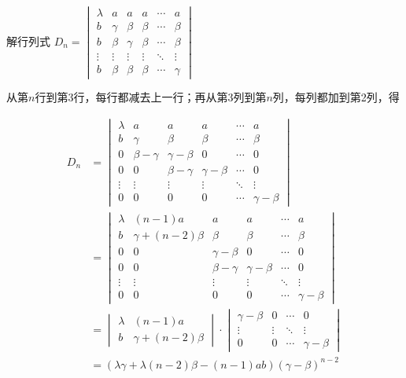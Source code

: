 \begin{example}
    解行列式
    $D_n=\begin{vmatrix}
        \lambda & a & a & a & \cdots & a \\
        b & \gamma & \beta & \beta & \cdots & \beta \\
        b & \beta & \gamma & \beta & \cdots & \beta \\
        \vdots & \vdots & \vdots & \vdots & \ddots & \vdots \\
        b & \beta & \beta & \beta & \cdots & \gamma
    \end{vmatrix}$
\end{example}

\begin{solution}
    从第$n$行到第3行，每行都减去上一行；再从第3列到第$n$列，每列都加到第2列，得

    \begin{align*}
        D_n&=
        \begin{vmatrix}
            \lambda & a & a & a & \cdots & a \\
            b & \gamma & \beta & \beta & \cdots & \beta \\
            0 & \beta-\gamma & \gamma-\beta & 0 & \cdots & 0 \\
            0 & 0 & \beta-\gamma & \gamma-\beta & \cdots & 0 \\
            \vdots & \vdots & \vdots & \vdots & \ddots & \vdots \\
            0 & 0 & 0 & 0 & \cdots & \gamma-\beta
        \end{vmatrix}\\
        &=\begin{vmatrix}
            \lambda & (n-1)a & a & a & \cdots & a \\
            b & \gamma+(n-2)\beta & \beta & \beta & \cdots & \beta \\
            0 & 0 & \gamma-\beta & 0 & \cdots & 0 \\
            0 & 0 & \beta-\gamma & \gamma-\beta & \cdots & 0 \\
            \vdots & \vdots & \vdots & \vdots & \ddots & \vdots \\
            0 & 0 & 0 & 0 & \cdots & \gamma-\beta
        \end{vmatrix}\\
        &=\begin{vmatrix}
            \lambda & (n-1)a \\
            b & \gamma+(n-2)\beta
        \end{vmatrix} \cdot \begin{vmatrix}
            \gamma-\beta & 0 & \cdots & 0 \\
            \vdots & \vdots & \ddots & \vdots \\
            0 & 0 & \cdots & \gamma-\beta
        \end{vmatrix}\\
        &=(\lambda \gamma+\lambda(n-2)\beta-(n-1)ab)(\gamma-\beta)^{n-2}
    \end{align*}
\end{solution}


